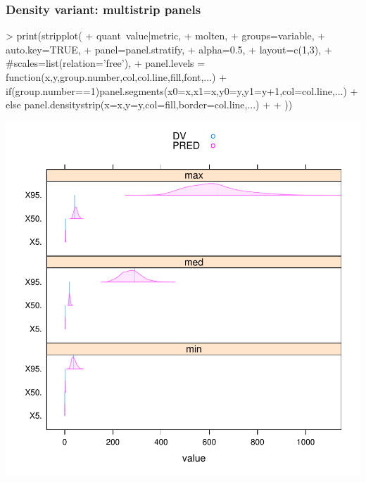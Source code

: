 \subsubsection{Density variant: multistrip panels}
\begin{Schunk}
\begin{Sinput}
> print(stripplot(
+ 	quant~value|metric,
+ 	molten,
+ 	groups=variable,
+ 	auto.key=TRUE,
+ 	panel=panel.stratify,
+ 	alpha=0.5,
+ 	layout=c(1,3),
+ 	#scales=list(relation='free'),
+ 	panel.levels = function(x,y,group.number,col,col.line,fill,font,...){
+ 		if(group.number==1)panel.segments(x0=x,x1=x,y0=y,y1=y+1,col=col.line,...)
+ 		else panel.densitystrip(x=x,y=y,col=fill,border=col.line,...)
+ 	}
+ ))
\end{Sinput}
\end{Schunk}
\includegraphics{model1-boa2}

